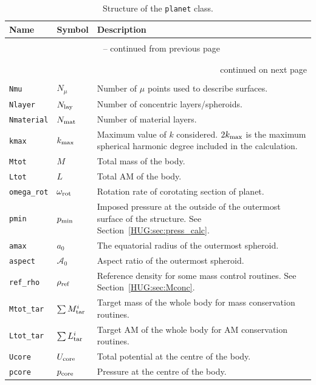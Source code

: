 \documentclass[11pt, oneside]{article}   	%
\begin{document}
\clearpage
\begin{longtable}{l l p{10cm}}
\caption{Structure of the \texttt{planet} class.}
\label{HUG:tab:planet_class} \\

Name & Symbol & Description \\ \hline \hline
\multicolumn{3}{l}{} \\
\endfirsthead

\multicolumn{3}{c}{{\tablename\ \thetable{} -- continued from previous page}} \\
\multicolumn{3}{l}{} \\
\endhead

\multicolumn{3}{l}{} \\
\multicolumn{3}{r}{{continued on next page}} \\
\endfoot

\endlastfoot

\multicolumn{3}{l}{Variables} \\
\hline
\texttt{Nmu} & $N_{\mu}$ & Number of $\mu$ points used to describe surfaces. \\
\texttt{Nlayer} & $N_{\rm lay}$ & Number of concentric layers/spheroids. \\
\texttt{Nmaterial} & $N_{\rm mat}$ & Number of material layers. \\
\texttt{kmax} & $k_{\rm max}$ & Maximum value of $k$ considered. $2k_{\rm max}$ is the maximum spherical harmonic degree included in the calculation. \\
\texttt{Mtot} & $M$ & Total mass of the body. \\
\texttt{Ltot} & $L$ & Total AM of the body. \\
\texttt{omega\_rot} & $\omega_{\rm rot}$ & Rotation rate of corotating section of planet. \\
\texttt{pmin} & $p_{\rm min}$ & Imposed pressure at the outside of the outermost surface of the structure. See Section~\ref{HUG:sec:press_calc}. \\
\texttt{amax} & $a_0$ & The equatorial radius of the outermost spheroid. \\
\texttt{aspect} & $\mathcal{A}_0$ & Aspect ratio of the outermost spheroid. \\
\texttt{ref\_rho} & $\rho_{\rm ref}$ & Reference density for some mass control routines. See Section~\ref{HUG:sec:Mconc}. \\
\texttt{Mtot\_tar} & $\sum M_{\rm tar}^i$ & Target mass of the whole body for mass conservation routines. \\
\texttt{Ltot\_tar} & $\sum L_{\rm tar}^i$ & Target AM of the whole body for AM conservation routines. \\
\texttt{Ucore} & $U_{\rm core}$ & Total potential at the centre of the body. \\
\texttt{pcore} & $p_{\rm core}$ & Pressure at the centre of the body. \\


\end{longtable}
\end{document}
